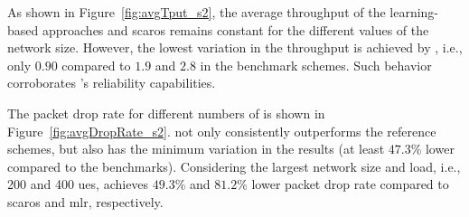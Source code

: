 As shown in Figure~\ref{fig:avgTput_s2}, the average throughput of the learning-based approaches \name{} and \gls{scaros} remains constant for the different values of the network size. However, the lowest variation in the  throughput is achieved by \name{}, i.e., only $0.90$ compared to $1.9$ and $2.8$ in the benchmark schemes. Such behavior corroborates \name{}'s reliability capabilities. 

The packet drop rate for different numbers of \nodes{} is shown in Figure~\ref{fig:avgDropRate_s2}. \name{} not only consistently outperforms the reference schemes, but also has the minimum variation in the results (at least $47.3$\% lower compared to the benchmarks). Considering the largest network size and load, i.e., 200 \nodes{} and 400 \glspl{ue}, \name{} achieves $49.3$\% and $81.2$\% lower packet drop rate compared to \gls{scaros} and \gls{mlr}, respectively. 

